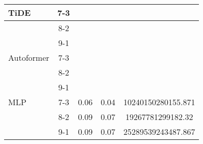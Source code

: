 \begin{table}[h!]
\begin{tabular}{|l|c|c|c|c|}
    \rowcolor{green!30} TiDE & 7-3 &  &  &  \\ \hline
    \rowcolor{green!30}  & 8-2 &  &  &  \\ \hline
    \rowcolor{green!30}  & 9-1 &  &  &  \\ \hline
    \rowcolor{white} Autoformer & 7-3 &  &  &  \\ \hline
    \rowcolor{white}  & 8-2 &  &  &  \\ \hline
    \rowcolor{white}  & 9-1 &  &  &  \\ \hline
    \rowcolor{white} MLP & 7-3 & 0.06 & 0.04& 10240150280155.871 \\ \hline
    \rowcolor{white}  & 8-2 & 0.09 & 0.07 & 19267781299182.32 \\ \hline
    \rowcolor{white}  & 9-1 & 0.09 & 0.07& 25289539243487.867  \\ \hline
    \end{tabular}
    \end{table}